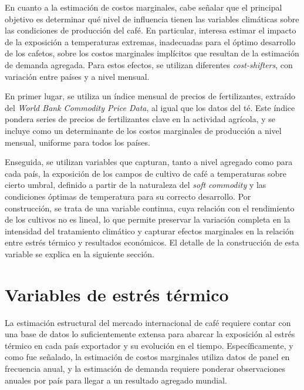 

En cuanto a la estimación de costos marginales, cabe señalar que el principal objetivo es determinar qué nivel de influencia tienen las variables climáticas sobre las condiciones de producción del café. En particular, interesa estimar el impacto de la exposición a temperaturas extremas, inadecuadas para el óptimo desarrollo de los cafetos, sobre los costos marginales implícitos que resultan de la estimación de demanda agregada. Para estos efectos, se utilizan diferentes \textit{cost-shifters}, con variación entre países y a nivel mensual.

En primer lugar, se utiliza un índice mensual de precios de fertilizantes, extraído del \textit{World Bank Commodity Price Data}, al igual que los datos del té. Este índice pondera series de precios de fertilizantes clave en la actividad agrícola, y se incluye como un determinante de los costos marginales de producción a nivel mensual, uniforme para todos los países.

Enseguida, se utilizan variables que capturan, tanto a nivel agregado como para cada país, la exposición de los campos de cultivo de café a temperaturas sobre cierto umbral, definido a partir de la naturaleza del \textit{soft commodity} y las condiciones óptimas de temperatura para su correcto desarrollo. Por construcción, se trata de una variable continua, cuya relación con el rendimiento de los cultivos no es lineal, lo que permite preservar la variación completa en la intensidad del tratamiento climático y capturar efectos marginales en la relación entre estrés térmico y resultados económicos. El detalle de la construcción de esta variable se explica en la siguiente sección.



\section{Variables de estrés térmico}

La estimación estructural del mercado internacional de café requiere contar con una base de datos lo suficientemente extensa para abarcar la exposición al estrés térmico en cada país exportador y su evolución en el tiempo. Específicamente, y como fue señalado, la estimación de costos marginales utiliza datos de panel en frecuencia anual, y la estimación de demanda requiere ponderar observaciones anuales por país para llegar a un resultado agregado mundial.

